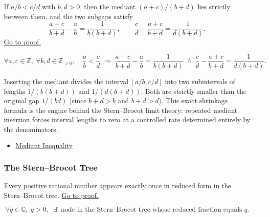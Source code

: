 \begin{lemma}
\label{lem:mediant-gap}
If $a/b < c/d$ with $b, d > 0$, then the mediant $(a+c)/(b+d)$ lies
strictly between them, and the two subgaps satisfy
\[
\frac{a+c}{b+d} - \frac{a}{b} = \frac{1}{b(b+d)},
\qquad
\frac{c}{d} - \frac{a+c}{b+d} = \frac{1}{d(b+d)}.
\]
\hyperref[prf:mediant-gap]{Go to proof.}
\end{lemma}

\begin{remark*}
\[
\forall a,c \in \mathbb{Z},\; \forall b,d \in \mathbb{Z}_{>0},\quad
\frac{a}{b} < \frac{c}{d}
\;\Longrightarrow\;
\frac{a+c}{b+d} - \frac{a}{b} = \frac{1}{b(b+d)}
\;\land\;
\frac{c}{d} - \frac{a+c}{b+d} = \frac{1}{d(b+d)}.
\]
\end{remark*}

\begin{remark*}[Interpretation]
Inserting the mediant divides the interval $[a/b, c/d]$ into two
subintervals of lengths $1/(b(b+d))$ and $1/(d(b+d))$.  Both are
strictly smaller than the original gap $1/(bd)$ (since $b+d > b$ and
$b+d > d$).  This exact shrinkage formula is the engine behind the
Stern--Brocot limit theory: repeated mediant insertion forces interval
lengths to zero at a controlled rate determined entirely by the
denominators.
\end{remark*}

\begin{remark*}[Dependencies]
\begin{itemize}
  \item \hyperref[thm:mediant-inequality]{Mediant Inequality}
\end{itemize}
\end{remark*}

\subsubsection*{The Stern--Brocot Tree}

\begin{theorem}
\label{thm:stern-brocot-enumeration}
Every positive rational number appears exactly once in reduced form in
the Stern--Brocot tree.
\hyperref[prf:stern-brocot-enumeration]{Go to proof.}
\end{theorem}

\begin{remark*}
\[
\forall q \in \mathbb{Q},\; q > 0,\;\;
\exists!\; \text{node in the Stern--Brocot tree whose reduced fraction equals } q.
\]
\end{remark*}

